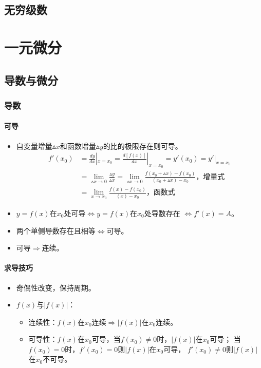 \documentclass[
12pt, %
a4paper, 
oneside, %
headinclude,footinclude, %
]{scrartcl}
\begin{document}
\subsection[无穷级数]{无穷级数}
\section{一元微分}
\subsection[导数与微分]{导数与微分}
\subsubsection[导数]{导数}
\paragraph{可导}
\begin{itemize}
\item 自变量增量$ \vartriangle x $和函数增量$ \vartriangle y $的比的极限存在则可导。
\begin{align*}
f'(x_0) &= \frac{dy}{dx}|_{x = x_0} = \frac{d[f(x)]}{dx}|_{x = x_0} = y'(x_0) = y'|_{x = x_0} \\
&= \lim_{\vartriangle x \to 0}\frac{\vartriangle y}{\vartriangle x} 
= \lim_{\vartriangle x \to 0}\frac{f(x_0 + \vartriangle x) - f(x_0)}{(x_0 + \vartriangle x) - x_0} \text{，增量式} \\
&= \lim_{x \to x_0}\frac{f(x) - f(x_0)}{(x) - x_0} \text{，函数式}
\end{align*}
\item $ y = f(x) $在$ x_0 $处可导$ \Leftrightarrow $$ y = f(x) $在$ x_0 $处导数存在
$ \Leftrightarrow $$ f'(x) = A $。
\item 两个单侧导数存在且相等$ \Leftrightarrow $可导。
\item 可导$ \Rightarrow $连续。
\end{itemize}
\paragraph{求导技巧}
\begin{itemize}
\item 奇偶性改变，保持周期。
\item $ f(x) $与$ |f(x)| $：
\begin{itemize}
\item 连续性：$ f(x) $在$ x_0 $连续$ \Rightarrow $$ |f(x)| $在$ x_0 $连续。
\item 可导性：$ f(x) $在$ x_0 $可导，当$ f(x_0) \neq 0 $时，$ |f(x)| $在$ x_0 $可导；
当$ f(x_0) = 0 $时，$ f'(x_0) = 0 $则$ |f(x)| $在$ x_0 $可导，
$ f'(x_0) \neq 0 $则$ |f(x)| $在$ x_0 $不可导。
\end{itemize}
\end{itemize}
\end{document}
